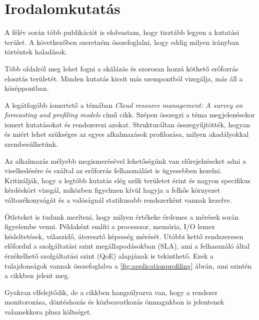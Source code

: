 \chapter{Irodalomkutatás}
\label{sec:Publications}
A félév során több publikációt is elolvastam, hogy tisztább legyen a kutatási terület. A következőben szeretném összefoglalni, hogy eddig milyen irányban történtek haladások.

Több oldalról meg lehet fogni a skálázás és szorosan hozzá köthető erőforrás elosztás területét. Minden kutatás kicsit más szempontból vizsgálja, más áll a középpontban.

A legátfogóbb ismertető a témában \emph{Cloud resource management: A survey on forecasting and profiling models}\citep{CloudResourceManagement} című cikk. Szépen összegzi a téma megjelenésekor ismert kutatásokat és rendszerezi azokat. Strukturáltan összegyűjtötték, hogyan és miért lehet szükséges az egyes alkalmazások profilozása, milyen akadályokkal szembesülhetünk.

Az alkalmazás mélyebb megismerésével lehetőségünk van előrejelzéseket adni a viselkedésére és ezáltal az erőforrás felhasználást is ügyesebben kezelni. Kritizálják, hogy a legtöbb kutatás elég szűk területet érint és nagyon specifikus kérdéskört vizsgál, miközben figyelmen kívül hagyja a felhős környezet változékonyságát és a valóságnál statikusabb rendszerként vannak kezelve. 

Ötleteket is tudunk meríteni, hogy milyen értékeke érdemes a mérések során figyelembe venni.
Példaként említi  a processzor, memória, I/O lemez késleltetések, válaszidő, áteresztő képesség
mérését. Utóbbi kettő rendszeresen előfordul a szolgáltatási szint megállapodásokban (SLA), ami a felhasználó által érzékelhető szolgáltatási szint (QoE) alapjának is tekinthető. 
Ezek a tulajdonságok vannak összefoglalva a \ref{fig:applicationprofiling} ábrán, ami szintén a cikkben jelent meg.

Gyakran elfelejtődik, de a cikkben hangsúlyozva van, hogy a rendszer monitorozása, döntéshozás és közbeavatkozás önmagukban is jelentenek valamekkora plusz költséget. \\


